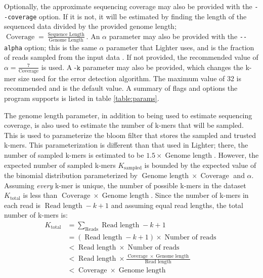 Optionally, the approximate sequencing coverage may also be provided with the \texttt{-\phantom{}-coverage} option. If it is not, it will be estimated by finding the length of the sequenced data divided by the provided genome length; $\operatorname{Coverage} = \frac{\operatorname{Sequence\:Length}}{\operatorname{Genome\:Length}}$.
An $\alpha$ parameter may also be provided with the \texttt{-\phantom{}-alpha} option; this is the same $\alpha$ parameter that Lighter uses, and is the fraction of reads sampled from the input data \parencite{song_lighter_2014}. If not provided, the recommended value of $\alpha = \frac{7}{\operatorname{Coverage}}$ is used.
A $\texttt{-k}$ parameter may also be provided, which changes the k-mer size used for the error detection algorithm. The maximum value of 32 is recommended and is the default value.
A summary of flags and options the program supports is listed in table \ref{table:params}.

The genome length parameter, in addition to being used to estimate sequencing coverage, is also used to estimate the number of k-mers that will be sampled. This is used to parameterize the bloom filter that stores the sampled and trusted k-mers. This parameterization is different than that used in Lighter; there, the number of sampled k-mers is estimated to be $1.5 \times \operatorname{Genome\:length}$. However, the expected number of sampled k-mers $K_{\operatorname{sampled}}$ is bounded by the expected value of the binomial distribution parameterized by $\operatorname{Genome\:length} \times \operatorname{Coverage}$ and $\alpha$. Assuming \textit{every} k-mer is unique, the number of possible k-mers in the dataset $K_{\operatorname{total}}$ is less than $\operatorname{Coverage} \times \operatorname{Genome\:length}$. Since the number of k-mers in each read is $\operatorname{Read\:length} - k + 1$ and assuming equal read lengths, the total number of k-mers is:
\begin{align}
K_{\operatorname{total}} &= \sum_{\operatorname{Reads}}{\operatorname{Read\:length} - k + 1} \\
&= (\operatorname{Read\:length} - k + 1) \times \operatorname{Number\:of\:reads} \\
&< \operatorname{Read\:length} \times \operatorname{Number\:of\:reads} \\
&< \operatorname{Read\:length} \times \frac{\operatorname{Coverage} \times \operatorname{Genome\:length}}{\operatorname{Read\:length}} \\
&< \operatorname{Coverage} \times \operatorname{Genome\:length}
\end{align}

